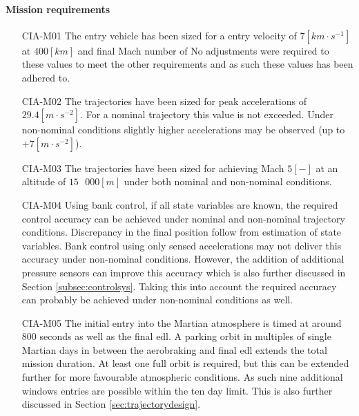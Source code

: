 \paragraph{Mission requirements}
\begin{itemize}[leftmargin=+20mm]
\item[CIA-M01]	The entry vehicle has been sized for a entry velocity of $7 \left[km \cdot s^{-1}\right]$ at $400 \left[km\right]$ and final Mach number of  No adjustments were required to these values to meet the other requirements and as such these values has been adhered to. 
\item[CIA-M02]	The trajectories have been sized for peak accelerations of $29.4 \left[m \cdot s^{-2}\right]$. For a nominal trajectory this value is not exceeded. Under non-nominal conditions slightly higher accelerations may be observed (up to $+7 \left[m \cdot s ^{-2}\right]$). 
\item[CIA-M03]  The trajectories have been sized for achieving Mach $5 \left[-\right]$ at an altitude of $15\mbox{ }000 \left[m\right]$ under both nominal and non-nominal conditions.
\item[CIA-M04]	Using bank control, if all state variables are known, the required control accuracy can be achieved under nominal and non-nominal trajectory conditions. Discrepancy in the final position follow from estimation of state variables. Bank control using only sensed accelerations may not deliver this accuracy under non-nominal conditions. However, the addition of additional pressure sensors can improve this accuracy which is also further discussed in Section \ref{subsec:controlsys}. Taking this into account the required accuracy can probably be achieved under non-nominal conditions as well.
\item[CIA-M05] The initial entry into the Martian atmosphere is timed at around $800$ seconds as well as the final \gls{edl}. A parking orbit in multiples of single Martian days in between the aerobraking and final \gls{edl} extends the total mission duration. At least one full orbit is required, but this can be extended further for more favourable atmospheric conditions. As such nine additional windows entries are possible within the ten day limit. This is also further discussed  in Section \ref{sec:trajectorydesign}.

\end{itemize}


